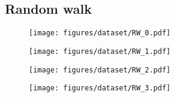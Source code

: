 \subsection{Random walk}
\begin{figure}[H]
    \centering
    \texttt{[image: figures/dataset/RW\_0.pdf]}
    \caption{}
    \label{fig:R0}
\end{figure}
\begin{figure}[H]
    \centering
    \texttt{[image: figures/dataset/RW\_1.pdf]}
    \caption{}
    \label{fig:R1}
\end{figure}
\begin{figure}[H]
    \centering
    \texttt{[image: figures/dataset/RW\_2.pdf]}
    \caption{}
    \label{fig:R2}
\end{figure}
\begin{figure}[H]
    \centering
    \texttt{[image: figures/dataset/RW\_3.pdf]}
    \caption{}
    \label{fig:R3}
\end{figure}



